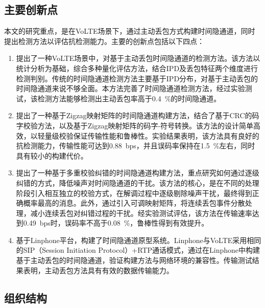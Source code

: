 \subsection{主要创新点}
\label{sec:intro:work:inno}

本文的研究重点，是在VoLTE场景下，通过主动丢包方式构建时间隐通道，同时提出检测方法以评估抗检测能力。主要的创新点包括以下四点：

\begin{enumerate}
    \item 提出了一种VoLTE场景中，对基于主动丢包时间隐通道的检测方法。该方法以统计分析为基础，综合多种量化评估方法，结合IPD及丢包特征两个维度进行检测判别。传统的时间隐通道检测方法主要基于IPD分布，对基于主动丢包的时间隐通道来说不够全面。本方法完善了时间隐通道检测方法，经过实验测试，该检测方法能够检测出主动丢包率高于{0.4\ \%}的时间隐通道。
    \item 提出了一种基于Zigzag映射矩阵的时间隐通道构建方法，结合了基于CRC的码字校验方法，以及基于Zigzag映射矩阵的码字-符号转换。该方法的设计简单高效，以轻量级校验保证传输性能和鲁棒性。实验结果表明，该方法具有良好的抗检测能力，传输性能可达到{0.88\ bps}，并且误码率保持在{1.5\ \%}左右，同时具有较小的构建代价。
    \item 提出了一种基于多重校验纠错的时间隐通道构建方法，重点研究如何通过逐级纠错的方式，降低噪声对时间隐通道的干扰。该方法的核心，是在不同的处理阶段引入相互独立的校验方式，在解调过程中逐级剔除噪声干扰，最终得到正确概率最高的消息。此外，通过引入可调映射矩阵，将连续丢包事件分散处理，减小连续丢包对纠错过程的干扰。经实验测试评估，该方法在传输速率达到{0.49\ bps}时，误码率不高于{0.08\ \%}，鲁棒性得到有效提升。
    \item 基于Linphone平台，构建了时间隐通道原型系统。Linphone与VoLTE采用相同的SIP（Session Initiation Protocol）+RTP通话模式，通过在Linphone中构建基于主动丢包的时间隐通道，验证构建方法与网络环境的兼容性。传输测试结果表明，主动丢包方法具有有效的数据传输能力。
\end{enumerate}

\subsection{组织结构}
\label{sec:intro:work:struct}

